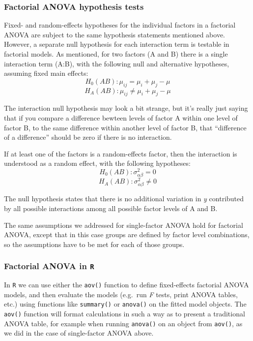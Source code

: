 \documentclass[
]{book}
\begin{document}
\hypertarget{factorial-anova-hypothesis-tests}{%
\subsubsection{Factorial ANOVA hypothesis tests}\label{factorial-anova-hypothesis-tests}}

Fixed- and random-effects hypotheses for the individual factors in a factorial ANOVA are subject to the same hypothesis statements mentioned above. However, a separate null hypothesis for each interaction term is testable in factorial models. As mentioned, for two factors (A and B) there is a single interaction term (A:B), with the following null and alternative hypotheses, assuming fixed main effects:
\[H_0(AB):\mu_{ij}=\mu_i+\mu_j-\mu\]
\[H_A(AB):\mu_{ij}\neq\mu_i+\mu_j-\mu\]

The interaction null hypothesis may look a bit strange, but it's really just saying that if you compare a difference bewteen levels of factor A within one level of factor B, to the same difference within another level of factor B, that ``difference of a difference'' should be zero if there is no interaction.

If at least one of the factors is a random-effects factor, then the interaction is understood as a random effect, with the following hypotheses:
\[H_0(AB):\sigma_{\alpha\beta}^2=0\]
\[H_A(AB):\sigma_{\alpha\beta}^2\neq0\]

The null hypothesis states that there is no additional variation in \emph{y} contributed by all possible interactions among all possible factor levels of A and B.

The same assumptions we addressed for single-factor ANOVA hold for factorial ANOVA, except that in this case groups are defined by factor level combinations, so the assumptions have to be met for each of those groups.

\hypertarget{factorial-anova-in-r}{%
\subsubsection{\texorpdfstring{Factorial ANOVA in \texttt{R}}{Factorial ANOVA in R}}\label{factorial-anova-in-r}}

In \texttt{R} we can use either the \texttt{aov()} function to define fixed-effects factorial ANOVA models, and then evaluate the models (e.g.~run \emph{F} tests, print ANOVA tables, etc.) using functions like \texttt{summary()} or \texttt{anova()} on the fitted model objects. The \texttt{aov()} function will format calculations in such a way as to present a traditional ANOVA table, for example when running \texttt{anova()} on an object from \texttt{aov()}, as we did in the case of single-factor ANOVA above.
\end{document}
